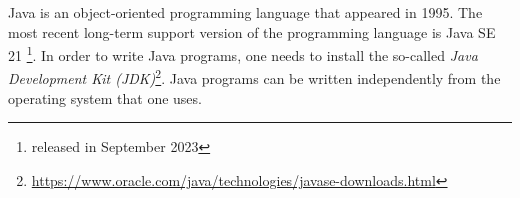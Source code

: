 Java is an object-oriented programming language that appeared in 1995. 
The most recent long-term support version of the programming language is Java SE 21 \footnote{released in September 2023}.
In order to write Java programs, one needs to install the so-called \emph{Java Development Kit 
(JDK)}\footnote{\url{https://www.oracle.com/java/technologies/javase-downloads.html}}.
Java programs can be written independently from the operating system that one uses.
